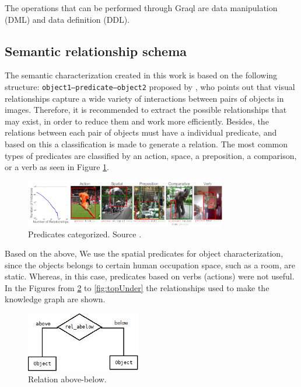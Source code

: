 The operations that can be performed through Graql are data manipulation (DML) 
and data definition (DDL).

\subsection{Semantic relationship schema}
The semantic characterization created in this work is based on the following 
structure: \texttt{object1--predicate--object2} proposed by \cite{Cewu}, who 
points out that visual relationships capture a wide variety of interactions 
between pairs of objects in images. Therefore, it is recommended to extract the 
possible relationships that may exist, in order to reduce them and work more 
efficiently. Besides, the relations between each pair of objects must 
have a individual predicate, and based on this a classification is made 
to generate a relation. The most common types of predicates are classified 
by an action, space, a preposition, a comparison, or a verb as seen in Figure 
\ref{fig:predaCar}.

\begin{figure}[H]
    \centering
    \includegraphics[width=8.8cm]{figures/predica.png}
    \caption{Predicates categorized. Source \cite{Cewu}.}
    \label{fig:predaCar}
\end{figure}

Based on the above, We use the spatial predicates for object characterization, 
since the objects belongs to certain human occupation space, 
such as a room, are static. Whereas, in this case, 
predicates based on verbs (actions) were not useful. In the Figures from 
\ref{fig:abelow} to \ref{fig:topUnder} the relationships used to make the 
knowledge graph are shown.

\begin{figure}[H]
    \centering
    \includegraphics[width=5cm]{figures/abelow.jpg}
    \caption{Relation above-below.}
    \label{fig:abelow}
\end{figure}

